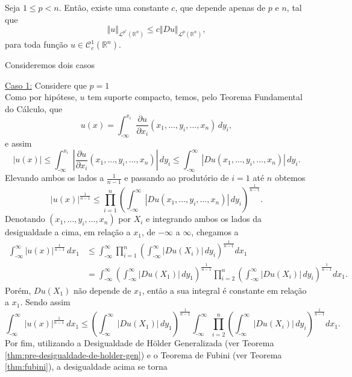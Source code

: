 \documentclass[a4paper, 11pt]{book}
\theoremstyle{definition}
\newcommand{\m}{\text{-}}
\newcommand{\bR}{\mathbb{R}}
\newcommand{\cC}{\mathcal{C}}
\newcommand{\cL}{\mathcal{L}}
\begin{document}
\begin{tbox} Seja $1 \leqslant p < n$. Então, existe uma constante $c$, que depende apenas de $p$ e $n$, tal que
\begin{equation} \label{eq:gns}
    \Vert u \Vert_{\cL^{p^*}(\bR^n)} \leqslant c \Vert Du \Vert_{\cL^p(\bR^n)},
\end{equation}
para toda função $u \in \cC^1_c(\bR^n)$.
\end{tbox}
\begin{prf}
    Consideremos dois casos

    \underline{Caso 1:} Considere que $p = 1$\\
    Como por hipótese, $u$ tem suporte compacto, temos, pelo Teorema Fundamental do Cálculo, que
    \[
        u(x) = \int_{\m\infty}^{x_i} \dfrac{\partial u}{\partial x_i}(x_1,\dots,y_i,\dots,x_n) \, dy_i,
    \]
    e assim
    \[
        |u(x)| \leqslant \int_{\m\infty}^{x_i} \left|\dfrac{\partial u}{\partial x_i}(x_1,\dots,y_i,\dots,x_n)\right| \, dy_i  \leqslant \int_{\m\infty}^{\infty} \left| Du(x_1,\dots,y_i,\dots,x_n) \right| \,dy_i.
    \]
    Elevando ambos os lados a $\frac{1}{n-1}$ e passando ao produtório de $i = 1$ até $n$ obtemos
    \[
        |u(x)|^{\frac{1}{n-1}} \leqslant \prod_{i=1}^n \left( \int_{\m\infty}^{\infty} |Du(x_1,\dots,y_i,\dots,x_n)| \,dy_i \right)^{\frac{1}{n-1}}.
    \]
    Denotando $(x_1,\dots,y_i,\dots,x_n)$ por $X_i$ e integrando ambos os lados da desigualdade a cima, em relação a $x_1$, de $-\infty$ a $\infty$, chegamos a
    \[
        \begin{aligned}
            \int_{\m\infty}^{\infty} |u(x)|^{\frac{1}{n-1}} \,dx_1 &\leqslant \int_{\m\infty}^{\infty} \prod_{i=1}^n \left( \int_{\m\infty}^{\infty} |Du(X_i)| \,dy_i \right)^{\frac{1}{n-1}}  dx_1\\ 
            &= \int_{\m\infty}^{\infty} \left( \int_{\m\infty}^{\infty} |Du(X_1)| \,dy_1 \right)^{\frac{1}{n-1}}  \prod_{i=2}^n \left(\int_{\m\infty}^{\infty} |Du(X_i)| \, dy_i\right)^{\frac{1}{n-1}} dx_1.
        \end{aligned}
    \]
    Porém, $Du(X_1)$ não depende de $x_1$, então a sua integral é constante em relação a $x_1$. Sendo assim
    \[
        \int_{\m\infty}^{\infty} |u(x)|^{\frac{1}{n-1}} \,dx_1 \leqslant \left( \int_{\m\infty}^{\infty} |Du(X_1)| \,dy_1 \right)^{\frac{1}{n-1}}\int_{\m\infty}^{\infty}   \prod_{i=2}^n \left(\int_{\m\infty}^{\infty} |Du(X_i)| \, dy_i\right)^{\frac{1}{n-1}} dx_1.
    \]
    Por fim, utilizando a Desigualdade de Hölder Generalizada (ver Teorema \ref{thm:pre-desigualdade-de-holder-gen}) e o Teorema de Fubini (ver Teorema \ref{thm:fubini}), a desigualdade acima se torna

\end{prf}
\end{document}
